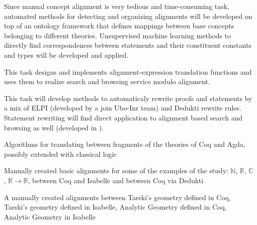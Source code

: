 \begin{workpackage}
\begin{tasklist}
  \begin{task}[id=aligntheories,title=Automated proof engineering,shorttitle=Autom.,lead=Imt,ImtRM=6,InnRM=6,SacRM=6,wphases=6-24!1]
    Since manual concept alignment is very tedious and time-consuming
    task, automated methods for detecting and organizing alignments
    will be developed on top of an ontology framework that defines
    mappings between base concepts belonging to different
    theories. Unsupervised machine learning methods to directly find
    correspondences between statements and their constituent constants
    and types will be developed and applied.
  \end{task}

  \begin{task}[id=alignsearch,title=Alignment-Based Search,shorttitle=Search,lead=Fau,FauRM=11,wphases=5-48!.33]
    This task designs and implements alignment-expression translation
    functions and uses them to realize search and browsing service
    modulo alignment.
  \end{task}
  
  \begin{task}[id=alignproofs,title=Proof-Rewriting,shorttitle=Rewr.,lead=Bol,BolRM=13,InrRM=6,wphases=36-48!1.6]
    This task will develop methods to automaticaly rewrite proofs and
    statements by a mix of ELPI (developed by a join Ubo-Inr team) and
    Dedukti rewrite rules. Statement rewriting will find direct
    application to alignment based search and browsing as well
    (developed in ).
  \end{task}
\end{tasklist}

\begin{wpdelivs}
  \begin{wpdeliv}[due=24,id=prooftheoretical,dissem=PU,nature=DEM,lead=Lee,task=alignlogic]{Algorithms for translating between fragments of the theories of Coq and Agda, possibly extended with classical logic}\end{wpdeliv}

  \begin{wpdeliv}[due=24,id=aligningnumbers,dissem=PU,nature=DEM,lead=Str,task=aligncasestudies]{Manually created basic alignments for some of the examples of the study: $\mathbb{N}$, $\mathbb{R}$, $\mathbb{C}$, $\mathbb{R} \rightarrow \mathbb{R}$, between Coq and Isabelle and between Coq via Dedukti}\end{wpdeliv}
  
  \begin{wpdeliv}[due=36,id=aligninggeometries,dissem=PU,nature=DEM,lead=Bel,task=aligncasestudies]{A manually created alignments between Tarski's geometry defined in Coq, Tarski's geometry defined in Isabelle, Analytic Geometry defined in Coq, Analytic Geometry in Isabelle}\end{wpdeliv}
  

\end{wpdelivs}
\end{workpackage}
